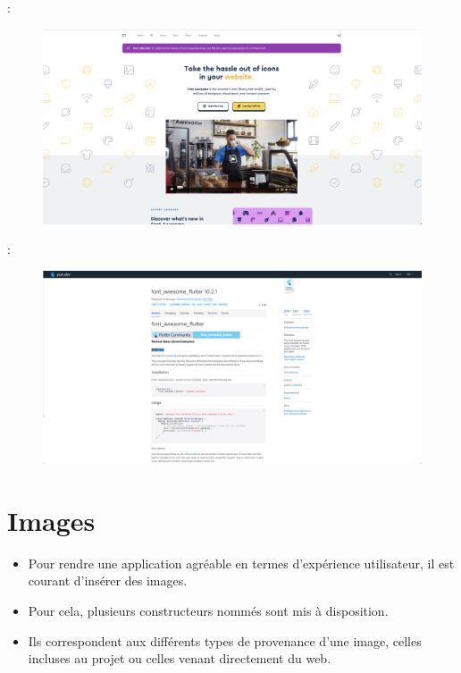 \documentclass[10pt]{beamer}
\begin{document}
\begin{frame}[fragile]{\secname : \subsecname}
    \begin{figure}
        \begin{center}
            \includegraphics[width=\textwidth]{../assets/img/FontAwesome.jpg}
        \end{center}
    \end{figure}
\end{frame}

\begin{frame}[fragile]{\secname : \subsecname}
    \begin{figure}
        \begin{center}
            \includegraphics[width=\textwidth]{../assets/img/FontAwesome--pub-dev.jpg}
        \end{center}
    \end{figure}
\end{frame}

\section{Images}
\begin{frame}[fragile]{\secname}
    \begin{itemize}
        \item Pour rendre une application agréable en termes d’expérience utilisateur, il est courant d’insérer des images.
        \item Pour cela, plusieurs constructeurs nommés sont mis à disposition.
        \item Ils correspondent aux différents types de provenance d’une image, celles incluses au projet ou celles venant directement du web.
    \end{itemize}
\end{frame}
\end{document}
